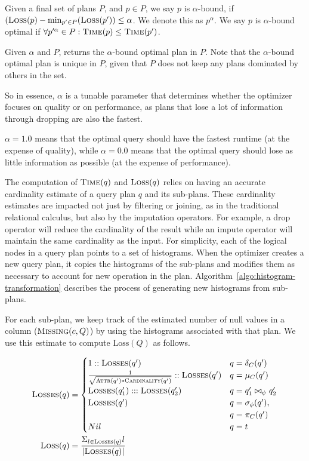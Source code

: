 \begin{definition}
Given a final set of plans $P$, and $p \in P$, we say $p$ is $\alpha$-bound, if $(\textsc{Loss}(p) - \min_{p' \in P}(\textsc{Loss}(p')) \leq \alpha$. We denote this as $p^\alpha$.
We say $p$ is $\alpha$-bound optimal if $\forall p'^\alpha \in P: \textsc{Time}(p) \leq \textsc{Time}(p')$. 
\end{definition}

Given $\alpha$ and $P$, \ProjectName{} returns the $\alpha$-bound optimal plan in $P$. Note that the $\alpha$-bound optimal plan is unique in $P$, given that
$P$ does not keep any plans dominated by others in the set.

So in essence, $\alpha$ is a tunable parameter that determines whether the optimizer focuses on quality or on performance, as plans that
lose a lot of information through dropping are also the fastest. 

$\alpha = 1.0$ means that the optimal query should have the fastest runtime (at the expense of quality), while $\alpha=0.0$ means that the optimal query should lose
as little information as possible (at the expense of performance).

The computation of $\textsc{Time}(q)$ and $\textsc{Loss}(q)$ relies on having an accurate cardinality estimate of a query plan $q$ and its sub-plans.
These cardinality estimates are impacted not just by filtering or joining, as in the traditional relational calculus, but also by the imputation operators.
For example, a drop operator will reduce the cardinality of the result while an impute operator will maintain the same cardinality as the input.
For simplicity, each of the logical nodes in a query plan points to a set of histograms.
When the optimizer creates a new query plan, it copies the histograms of the sub-plans and modifies them as necessary to account for new operation in the plan.
Algorithm~\ref{algo:histogram-transformation} describes the process of generating new histograms from sub-plans.

For each sub-plan, we keep track of the estimated number of
null values in a column  ($\textsc{Missing}(c, Q)$) by using the histograms associated with
that plan. We use this estimate to compute $\text{Loss}(Q)$ as follows.

\begin{align*}
  \textsc{Losses}(q) &= \begin{cases}
     1 :: \textsc{Losses}(q') & q = \delta_C(q') \\
    \frac{1}{\sqrt{ \textsc{Attr}(q') * \textsc{Cardinality}(q') }}  :: \textsc{Losses}(q')  & q = \mu_C(q') \\
    \textsc{Losses}(q_1') ::: \textsc{Losses}(q_2') & q = q_1' \bowtie_\psi q_2' \\
    \textsc{Losses}(q') & q = \sigma_\phi(q'), \\ & q = \pi_C(q') \\
    Nil & q = t\\
  \end{cases}\\
  \textsc{Loss}(q) &= \frac{\Sigma_{l \in \textsc{Losses}(q)} l}{| \textsc{Losses}(q)|}
\end{align*}

